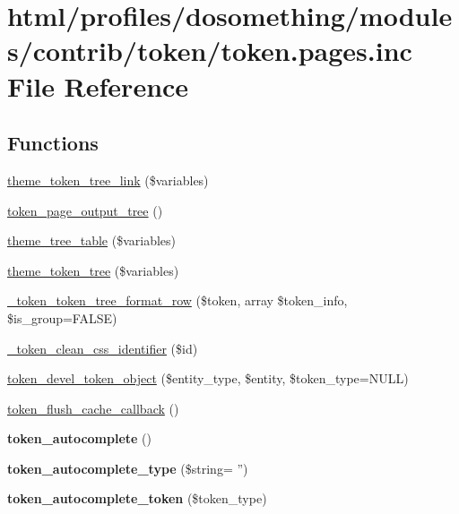 \hypertarget{token_8pages_8inc}{
\section{html/profiles/dosomething/modules/contrib/token/token.pages.inc File Reference}
\label{token_8pages_8inc}
}
\subsection*{Functions}
\begin{DoxyCompactItemize}
\item 
\hyperlink{token_8pages_8inc_a111e8ee04e4553f7c6bd04732a175435}{theme\_\-token\_\-tree\_\-link} (\$variables)
\item 
\hyperlink{token_8pages_8inc_ac61826267ce539194039a1e0d1b1c85d}{token\_\-page\_\-output\_\-tree} ()
\item 
\hyperlink{group__themeable_ga27af1c0cde4fa8fd2b1ac04f516e2ca6}{theme\_\-tree\_\-table} (\$variables)
\item 
\hyperlink{group__themeable_ga134bf969c587784a30834201a24284e2}{theme\_\-token\_\-tree} (\$variables)
\item 
\hyperlink{token_8pages_8inc_ad7895827dd47b9617320c5a9de747ee7}{\_\-token\_\-token\_\-tree\_\-format\_\-row} (\$token, array \$token\_\-info, \$is\_\-group=FALSE)
\item 
\hyperlink{token_8pages_8inc_ae945ed316363ca5b9c9b56c6554c493c}{\_\-token\_\-clean\_\-css\_\-identifier} (\$id)
\item 
\hyperlink{token_8pages_8inc_a2bdee1bca10e805d74679a6e50c6c7d8}{token\_\-devel\_\-token\_\-object} (\$entity\_\-type, \$entity, \$token\_\-type=NULL)
\item 
\hyperlink{token_8pages_8inc_ad77cea030ce3c4aa50e43d5b93d91908}{token\_\-flush\_\-cache\_\-callback} ()
\item 
\hypertarget{token_8pages_8inc_a2ad4879ecb5e0cdf76baf2a1230635e6}{
{\bfseries token\_\-autocomplete} ()}
\label{token_8pages_8inc_a2ad4879ecb5e0cdf76baf2a1230635e6}

\item 
\hypertarget{token_8pages_8inc_aba64386bdb78d49a36ab22bd146a83f7}{
{\bfseries token\_\-autocomplete\_\-type} (\$string= '')}
\label{token_8pages_8inc_aba64386bdb78d49a36ab22bd146a83f7}

\item 
\hypertarget{token_8pages_8inc_a81eb5e4efc6c1690d6ab4b726bcfd84d}{
{\bfseries token\_\-autocomplete\_\-token} (\$token\_\-type)}
\label{token_8pages_8inc_a81eb5e4efc6c1690d6ab4b726bcfd84d}

\end{DoxyCompactItemize}


